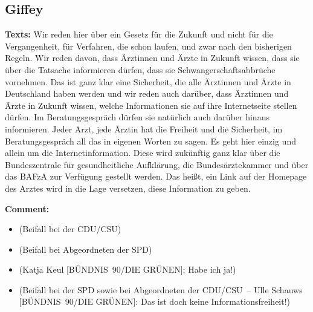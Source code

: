 \documentclass{article}
\begin{document}
\subsection{Giffey}
\noindent\textbf{Texts:} Wir reden hier über ein Gesetz für die Zukunft und nicht für die Vergangenheit, für Verfahren, die schon laufen, und zwar nach den bisherigen Regeln. Wir reden davon, dass Ärztinnen und Ärzte in Zukunft wissen, dass sie über die Tatsache informieren dürfen, dass sie Schwangerschaftsabbrüche vornehmen.  Das ist ganz klar eine Sicherheit, die alle Ärztinnen und Ärzte in Deutschland haben werden und wir reden auch darüber, dass Ärztinnen und Ärzte in Zukunft wissen, welche Informationen sie auf ihre Internetseite stellen dürfen. Im Beratungsgespräch dürfen sie natürlich auch darüber hinaus informieren. Jeder Arzt, jede Ärztin hat die Freiheit und die Sicherheit, im Beratungsgespräch all das in eigenen Worten zu sagen. Es geht hier einzig und allein um die Internetinformation. Diese wird zukünftig ganz klar über die Bundeszentrale für gesundheitliche Aufklärung, die Bundesärztekammer und über das BAFzA zur Verfügung gestellt werden. Das heißt, ein Link auf der Homepage des Arztes wird in die Lage versetzen, diese Information zu geben.   

\noindent\textbf{Comment:}
\begin{itemize}
    \setlength\itemsep{-3pt}
    \item (Beifall bei der CDU/CSU)
    \setlength\itemsep{-3pt}
    \item (Beifall bei Abgeordneten der SPD)
    \setlength\itemsep{-3pt}
    \item (Katja Keul [BÜNDNIS 90/DIE GRÜNEN]: Habe ich ja!)
    \setlength\itemsep{-3pt}
    \item (Beifall bei der SPD sowie bei Abgeordneten der CDU/CSU – Ulle Schauws [BÜNDNIS 90/DIE GRÜNEN]: Das ist doch keine Informationsfreiheit!)
\end{itemize}
\end{document}
